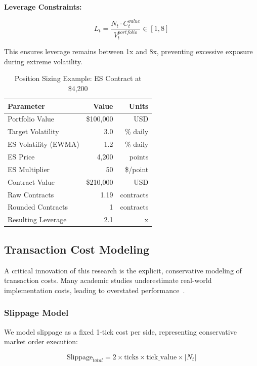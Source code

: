 \documentclass[twocolumn,ieee]{arithmaxresearch}
\begin{document}
\textbf{Leverage Constraints:}

\begin{equation}
L_t = \frac{N_t \cdot C_t^{value}}{V_t^{portfolio}} \in [1, 8]
\end{equation}

This ensures leverage remains between 1x and 8x, preventing excessive exposure during extreme volatility.

\begin{table}[h]
\centering
\caption{Position Sizing Example: ES Contract at \$4,200}
\label{tab:position_sizing}
\begin{tabular}{@{}lrr@{}}
\toprule
\textbf{Parameter} & \textbf{Value} & \textbf{Units} \\
\midrule
Portfolio Value & \$100,000 & USD \\
Target Volatility & 3.0 & \% daily \\
ES Volatility (EWMA) & 1.2 & \% daily \\
ES Price & 4,200 & points \\
ES Multiplier & 50 & \$/point \\
Contract Value & \$210,000 & USD \\
\midrule
Raw Contracts & 1.19 & contracts \\
Rounded Contracts & 1 & contracts \\
Resulting Leverage & 2.1 & x \\
\bottomrule
\end{tabular}
\end{table}

\subsection{Transaction Cost Modeling}

A critical innovation of this research is the explicit, conservative modeling of transaction costs. Many academic studies underestimate real-world implementation costs, leading to overstated performance~\cite{lesmond2004costs}.

\subsubsection{Slippage Model}

We model slippage as a fixed 1-tick cost per side, representing conservative market order execution:

\begin{equation}
\text{Slippage}_{total} = 2 \times \text{ticks} \times \text{tick\_value} \times |N_t|
\end{equation}
\end{document}
